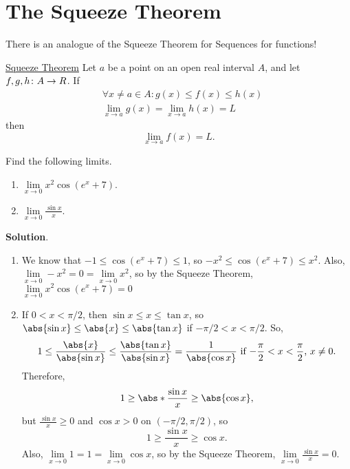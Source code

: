 \section{The Squeeze Theorem}
There is an analogue of the Squeeze Theorem for Sequences for functions!
\begin{Theorem}{\href{https://proofwiki.org/wiki/Squeeze_Theorem/Functions}{Squeeze Theorem}}{}
    Let $ a $ be a point on an open real interval $ A $, and let $ f,g,h\colon A\to \relax{R} $. If
    \begin{align*}
         & \forall x\ne a\in A:g(x)\le f(x)\le h(x)                      \\
         & \lim\limits_{{x} \to {a}}g(x)=\lim\limits_{{x} \to {a}}h(x)=L
    \end{align*}
    then
    \[ \lim\limits_{{x} \to {a}}f(x)=L. \]
\end{Theorem}
\begin{Example}{}{}
    Find the following limits.
    \begin{enumerate}[(1)]
        \item $ \lim\limits_{{x} \to {0}}x^2\cos(e^x+7) $.
        \item $ \lim\limits_{{x} \to {0}}\frac{\sin x}{x} $.
    \end{enumerate}
    \tcblower{}
    \textbf{Solution}.
    \begin{enumerate}[(1)]
        \item We know that $ -1\le \cos(e^x+7)\le 1 $, so $ -x^2\le \cos(e^x+7)\le x^2 $. Also,
              $\lim\limits_{{x} \to {0}}-x^2=0=\lim\limits_{{x} \to {0}}x^2$, so by the Squeeze Theorem,
              $ \lim\limits_{{x} \to {0}}x^2\cos(e^x+7)=0 $
        \item If $ 0<x<\pi/2 $, then $ \sin x\le x\le \tan x $, so $ \abs{\sin x}\le \abs{x}\le \abs{\tan x} $ if $ -\pi/2<x<\pi/2 $.
              So,
              \[ 1\le \frac{\abs{x}}{\abs{\sin x}}\le \frac{\abs{\tan x}}{\abs{\sin x}}=\frac{1}{\abs{\cos x}}\text{ if $ -\frac{\pi}{2}<x<\frac{\pi}{2} $, $x\ne 0$}. \]
              Therefore,
              \[ 1\ge \abs*{\frac{\sin x}{x}}\ge \abs{\cos x}, \]
              but $ \displaystyle \frac{\sin x}{x}\ge 0 $ and $ \cos x>0 $ on $ (-\pi/2,\pi/2) $, so
              \[ 1\ge \frac{\sin x}{x}\ge \cos x. \]
              Also, $ \lim\limits_{{x} \to {0}}1=1=\lim\limits_{{x} \to {0}}\cos x $, so by the Squeeze Theorem,
              $ \lim\limits_{{x} \to {0}}\frac{\sin x}{x}=0 $.
    \end{enumerate}
\end{Example}